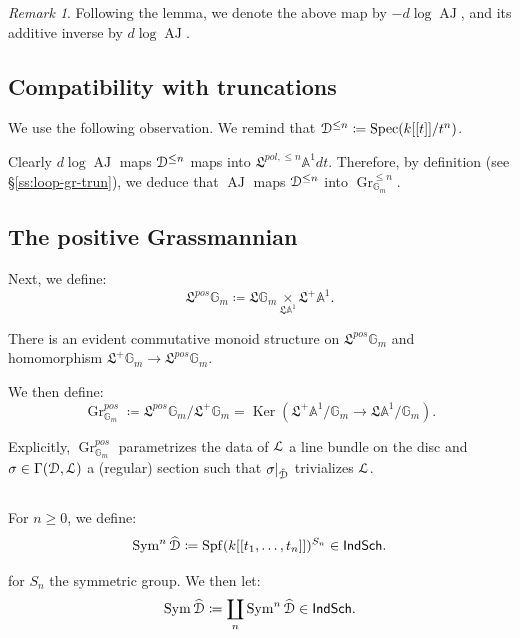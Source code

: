 \documentclass[reqno,11pt]{amsart}
\numberwithin{equation}{subsection}
\theoremstyle{remark}
\newtheorem{rem}[thm]{Remark}
\newcommand{\bA}{{\mathbb A}}
\newcommand{\bG}{{\mathbb G}}
\newcommand{\sD}{{\EuScript D}}
\newcommand{\sL}{{\EuScript L}}
\newcommand{\fL}{{\mathfrak L}}
\newcommand{\on}{\operatorname}
\newcommand{\Ker}{\on{Ker}}
\newcommand{\Spec}{\on{Spec}}
\newcommand{\Spf}{\on{Spf}}
\newcommand{\Gr}{\on{Gr}}
\newcommand{\Sym}{\on{Sym}}
\newcommand{\IndSch}{\mathsf{IndSch}}
\newcommand{\AJ}{\on{AJ}}
\renewcommand{\o}[1]{\mathring{#1}}
\begin{document}
\begin{rem}

Following the lemma, we denote the above map by 
$-d\log \AJ$, and its additive inverse by $d\log \AJ$.

\end{rem}


\subsection{Compatibility with truncations}\label{ss:aj-trun}

We use the following observation. We remind that
$\sD^{\leq n} \coloneqq \Spec(k[[t]]/t^n)$.

Clearly $d\log \AJ$ maps $\sD^{\leq n}$ maps 
into $\fL^{pol,\leq n} \bA^1 dt$. 
Therefore, by definition (see \S \ref{ss:loop-gr-trun}),
we deduce that $\AJ$ maps $\sD^{\leq n}$ into 
$\Gr_{\bG_m}^{\leq n}$.

\subsection{The positive Grassmannian}\label{ss:pos-gr}

Next, we define: 
%
\[
\fL^{pos} \bG_m \coloneqq
\fL \bG_m \underset{\fL \bA^1} {\times} \fL^+ \bA^1.
\]

\noindent There is an evident commutative monoid
structure on $\fL^{pos} \bG_m$ and homomorphism
$\fL^+ \bG_m \to \fL^{pos} \bG_m$.

We then define:
%
\[
\Gr_{\bG_m}^{pos} \coloneqq \fL^{pos} \bG_m/\fL^+ \bG_m =
\Ker(\fL^+\bA^1/\bG_m \to \fL \bA^1/\bG_m).
\]

Explicitly, $\Gr_{\bG_m}^{pos}$ parametrizes
the data of $\sL$ a line bundle on the disc and
$\sigma \in \Gamma(\sD,\sL)$ a (regular) section
such that $\sigma|_{\o{\sD}}$ trivializes $\sL$.

\subsection{}

For $n \geq 0$, we define: 
%
\[
\Sym^n \widehat{\sD} \coloneqq \Spf(k[[t_1,\ldots,t_n]])^{S_n} 
\in \IndSch.
\]

\noindent for $S_n$ the symmetric group.
We then let: 
%
\[
\Sym\widehat{\sD} \coloneqq 
\coprod_n \Sym^n \widehat{\sD} \in \IndSch.
\]

\subsection{}
\end{document}
